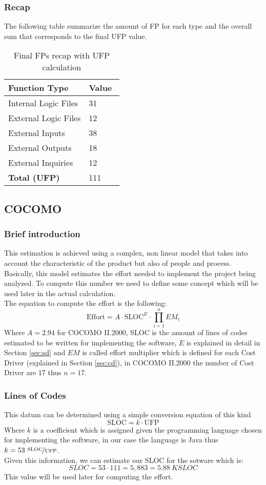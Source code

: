 \subsubsection{Recap}
The following table summarize the amount of FP for each type and the overall sum that corresponds to the final UFP value.
\begin{table}[H]
	\centering
	\begin{tabular}{|p{0.7\linewidth}|R{0.3\linewidth}|}
		\hline
		\textbf{Function Type} & \textbf{Value} \\ \hline
		Internal Logic Files & 31 \\ \hline
		External Logic Files & 12 \\ \hline
		External Inputs & 38 \\ \hline
		External Outputs & 18 \\ \hline
		External Inquiries & 12 \\ \hline
		\textbf{Total (UFP)} & 111 \\
		\hline
	\end{tabular}
	\caption{Final FPs recap with UFP calculation}
\end{table}
\subsection{COCOMO}
\subsubsection{Brief introduction}
\label{sec:cocomo-int}
This estimation is achieved using a complex, non linear model that takes into account the characteristic of the product but also of people and process. \\
Basically, this model estimates the effort needed to implement the project being analyzed. To compute this number we need to define some concept which will be used later in the actual calculation. \\
The equation to compute the effort is the following:
$$\textrm{Effort} = A \cdot \textrm{SLOC}^E \cdot \prod_{i=1}^{n} EM_i$$
Where $A = 2.94$ for COCOMO II.2000, SLOC is the amount of lines of codes estimated to be written for implementing the software, $E$ is explained in detail in Section \ref{sec:sd} and $EM$ is called effort multiplier which is defined for each Cost Driver (explained in Section \ref{sec:cd}), in COCOMO II.2000 the number of Cost Driver are 17 thus $n = 17$.
\subsubsection{Lines of Codes}
This datum can be determined using a simple conversion equation of this kind
$$ \textrm{SLOC} = k \cdot \textrm{UFP} $$
Where $k$ is a coefficient which is assigned given the programming language chosen for implementing the software, in our case the language is Java thus $k = 53\ \nicefrac{\textrm{SLOC}}{\textrm{UFP}}$. \\
Given this information, we can estimate our SLOC for the sotware which is:
$$SLOC = 53 \cdot 111 = 5,883 = 5.88\ KSLOC$$
This value will be used later for computing the effort.
